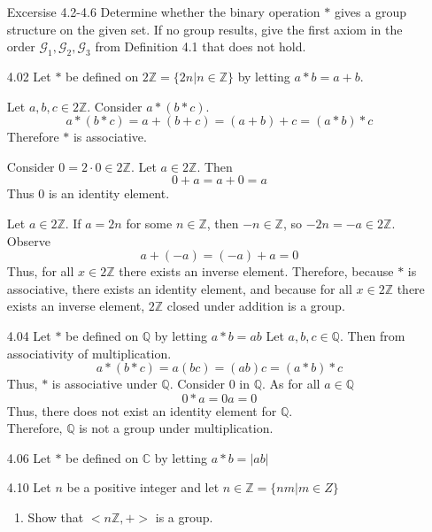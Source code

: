 \documentclass[12pt]{article}
\newcommand{\Z}{\mathds{Z}}
\newcommand{\C}{\mathbb{C}}
\newcommand{\Q}{\mathbb{Q}}
\begin{document}

	\begin{enumerate}
		
		\item[Excersise 4.2-4.6]Determine whether the binary operation $*$ gives a group structure on the given set. If no group results, give the first axiom in the order $\mathscr{G}_1,\mathscr{G}_2, \mathscr{G}_3$ from Definition 4.1 that does not hold.
			\item[4.02] Let $*$ be defined on $2\Z = \{2n|n\in \Z\}$ by letting $a * b = a + b$.
			
			Let $a,b,c \in 2\Z$.
			Consider $a*(b* c)$. \[a* (b * c) = a + (b + c) = (a + b) + c = (a* b)* c\] Therefore $*$ is associative.
			
			Consider $0 = 2\cdot 0 \in 2 \Z$. Let $a \in 2\Z$. Then \[ 0 + a = a + 0 = a\] Thus 0 is an identity element.
			
			Let $a \in 2\Z$. If $a = 2n$ for some $n\in \Z$, then $-n \in \Z$, so $-2n = -a \in 2\Z$. Observe \[a + (-a) = (-a) + a = 0\]
			Thus, for all $x \in 2\Z$ there exists an inverse element.
			Therefore, because $*$ is associative, there exists an identity element, and because for all $x \in 2\Z$ there exists an inverse element, $2\Z$ closed under addition is a group.
			
			\item[4.04] Let $*$ be defined on $\Q$ by letting $a* b = ab$
				Let $ a,b,c \in \Q $. Then from associativity of multiplication.
				\[a*(b*c)=a(bc)=(ab)c=(a*b)*c\]
				Thus, $ * $ is associative under $ \Q $.
				Consider 0 in $ \Q $. As for all $ a \in \Q $
					\[0*a=0a=0\]
				Thus, there does not exist an identity element for $ \Q $.\\
				Therefore, $ \Q $ is not a group under multiplication.
			\item[4.06] Let $*$ be defined on $\C$ by letting $a* b = |ab|$
			
			\item[4.10] Let $n$ be a positive integer and let $n\in\Z = \{nm | m\in Z\}$
			\begin{enumerate}
				\item Show that $ <n\Z,+> $ is a group.
				

\end{enumerate}
\end{enumerate}
\end{document}
